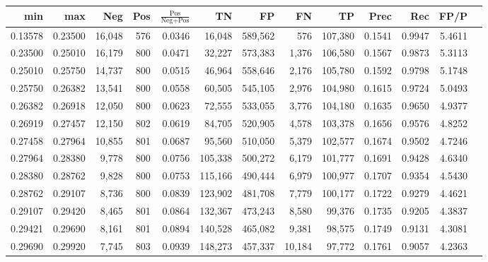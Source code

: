 \begin{tabular}{rrrrrrrrrrrrr}
\toprule
    min &     max &    Neg & Pos & $\frac{\text{Pos}}{\text{Neg}+\text{Pos}}$ &      TN &      FP &      FN &      TP &   Prec &    Rec &   FP/P \\
\midrule
0.13578 & 0.23500 & 16,048 & 576 &                                     0.0346 &  16,048 & 589,562 &     576 & 107,380 & 0.1541 & 0.9947 & 5.4611 \\
0.23500 & 0.25010 & 16,179 & 800 &                                     0.0471 &  32,227 & 573,383 &   1,376 & 106,580 & 0.1567 & 0.9873 & 5.3113 \\
0.25010 & 0.25750 & 14,737 & 800 &                                     0.0515 &  46,964 & 558,646 &   2,176 & 105,780 & 0.1592 & 0.9798 & 5.1748 \\
0.25750 & 0.26382 & 13,541 & 800 &                                     0.0558 &  60,505 & 545,105 &   2,976 & 104,980 & 0.1615 & 0.9724 & 5.0493 \\
0.26382 & 0.26918 & 12,050 & 800 &                                     0.0623 &  72,555 & 533,055 &   3,776 & 104,180 & 0.1635 & 0.9650 & 4.9377 \\
0.26919 & 0.27457 & 12,150 & 802 &                                     0.0619 &  84,705 & 520,905 &   4,578 & 103,378 & 0.1656 & 0.9576 & 4.8252 \\
0.27458 & 0.27964 & 10,855 & 801 &                                     0.0687 &  95,560 & 510,050 &   5,379 & 102,577 & 0.1674 & 0.9502 & 4.7246 \\
0.27964 & 0.28380 &  9,778 & 800 &                                     0.0756 & 105,338 & 500,272 &   6,179 & 101,777 & 0.1691 & 0.9428 & 4.6340 \\
0.28380 & 0.28762 &  9,828 & 800 &                                     0.0753 & 115,166 & 490,444 &   6,979 & 100,977 & 0.1707 & 0.9354 & 4.5430 \\
0.28762 & 0.29107 &  8,736 & 800 &                                     0.0839 & 123,902 & 481,708 &   7,779 & 100,177 & 0.1722 & 0.9279 & 4.4621 \\
0.29107 & 0.29420 &  8,465 & 801 &                                     0.0864 & 132,367 & 473,243 &   8,580 &  99,376 & 0.1735 & 0.9205 & 4.3837 \\
0.29421 & 0.29690 &  8,161 & 801 &                                     0.0894 & 140,528 & 465,082 &   9,381 &  98,575 & 0.1749 & 0.9131 & 4.3081 \\
0.29690 & 0.29920 &  7,745 & 803 &                                     0.0939 & 148,273 & 457,337 &  10,184 &  97,772 & 0.1761 & 0.9057 & 4.2363 \\

\end{tabular}
